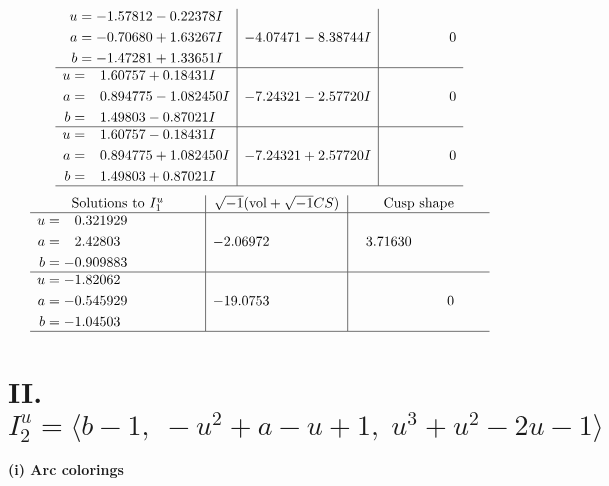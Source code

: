 \documentclass[1p]{elsarticle_modified}
\theoremstyle{definition}
\newcommand{\I}{\sqrt{-1}}
\begin{document}
$$\begin{array}{c|c|c}
\begin{aligned}
u &= -1.57812 - 0.22378 I \\
a &= -0.70680 + 1.63267 I \\
b &= -1.47281 + 1.33651 I\end{aligned}
 & -4.07471 - 8.38744 I & \phantom{-0.000000 } 0 \\ \hline\begin{aligned}
u &= \phantom{-}1.60757 + 0.18431 I \\
a &= \phantom{-}0.894775 - 1.082450 I \\
b &= \phantom{-}1.49803 - 0.87021 I\end{aligned}
 & -7.24321 - 2.57720 I & \phantom{-0.000000 } 0 \\ \hline\begin{aligned}
u &= \phantom{-}1.60757 - 0.18431 I \\
a &= \phantom{-}0.894775 + 1.082450 I \\
b &= \phantom{-}1.49803 + 0.87021 I\end{aligned}
 & -7.24321 + 2.57720 I & \phantom{-0.000000 } 0\\
 \hline 
 \end{array}$$\newpage$$\begin{array}{c|c|c}  
\text{Solutions to }I^u_{1}& \I (\text{vol} + \sqrt{-1}CS) & \text{Cusp shape}\\
 \hline 
\begin{aligned}
u &= \phantom{-}0.321929\phantom{ +0.000000I} \\
a &= \phantom{-}2.42803\phantom{ +0.000000I} \\
b &= -0.909883\phantom{ +0.000000I}\end{aligned}
 & -2.06972\phantom{ +0.000000I} & \phantom{-}3.71630\phantom{ +0.000000I} \\ \hline\begin{aligned}
u &= -1.82062\phantom{ +0.000000I} \\
a &= -0.545929\phantom{ +0.000000I} \\
b &= -1.04503\phantom{ +0.000000I}\end{aligned}
 & -19.0753\phantom{ +0.000000I} & \phantom{-0.000000 } 0\\
 \hline 
 \end{array}$$\newpage\newpage\renewcommand{\arraystretch}{1}
\centering \section*{II. $I^u_{2}= \langle b-1,\;- u^2+a- u+1,\;u^3+u^2-2 u-1 \rangle$}
\flushleft \textbf{(i) Arc colorings}\\
\end{document}
